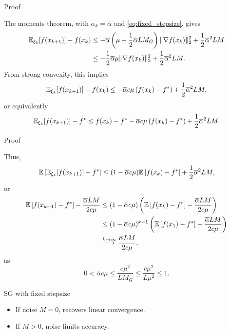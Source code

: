 \documentclass[usepdftitle=false, aspectratio=169]{beamer}
\begin{document}
\begin{frame}{Proof}

The moments theorem, with $\alpha_k = \overline{\alpha}$ and \eqref{eq:fixed_stepsize}, gives
\begin{align*}
{\mathbb{E}}_{\xi_k}[f(x_{k+1})] - f(x_k)
	& \leq - \overline{\alpha}\left( \mu -\frac{1}{2}\overline{\alpha} LM_G \right) \| \nabla f(x_k) \|_2^2
	+ \frac{1}{2} \overline{\alpha}^2 LM \\
	& \leq -\frac{1}{2} \overline{\alpha} \mu \| \nabla f(x_k) \|_2^2
	+ \frac{1}{2} \overline{\alpha}^2 LM.
\end{align*}
From strong convexity, this implies
$$
{\mathbb{E}}_{\xi_k}[f(x_{k+1})] - f(x_k) \leq
- \overline{\alpha} c \mu \left( f(x_k) - f^* \right) + \frac{1}{2} \overline{\alpha}^2 LM,
$$
or equivalently
$$
{\mathbb{E}}_{\xi_k}[f(x_{k+1})] - f^* \leq
f(x_k) - f^* - \overline{\alpha} c \mu \left( f(x_k) - f^* \right) + \frac{1}{2} \overline{\alpha}^2 LM.
$$

\end{frame}

\begin{frame}{Proof}

Thus,
$$
{\mathbb{E}} \left[ {\mathbb{E}}_{\xi_k}[f(x_{k+1})] - f^* \right] \leq
(1 - \overline{\alpha} c \mu) {\mathbb{E}} \left[ f(x_k) - f^* \right] + \frac{1}{2} \overline{\alpha}^2 LM,
$$
or
\begin{align*}
{\mathbb{E}} \left[ f(x_{k+1}) - f^* \right] - \frac{\overline{\alpha} LM}{ 2c \mu}
& \leq
(1 - \overline{\alpha} c \mu) \left( {\mathbb{E}} \left[ f(x_k) - f^* \right] - \frac{\overline{\alpha} LM}{ 2c \mu} \right) \\
& \leq
(1 - \overline{\alpha} c \mu)^{k-1} \left( {\mathbb{E}} \left[ f(x_1) - f^* \right] - \frac{\overline{\alpha} LM}{ 2c \mu} \right) \\
& \overset{k \rightarrow \infty}{\longrightarrow} \frac{\overline{\alpha}LM}{2c\mu},
\end{align*}
as
$$
0 < \overline{\alpha} c \mu \leq \frac{c\mu^2}{LM_G}
\leq \frac{c\mu^2}{L\mu^2} \leq 1.
$$
	
\end{frame}

\begin{frame}{SG with fixed stepsize}

\begin{itemize}
	\item If noise \(M=0\), recovers linear convergence.
	\item If \(M>0\), noise limits accuracy.
\end{itemize}
	
\end{frame}
\end{document}
